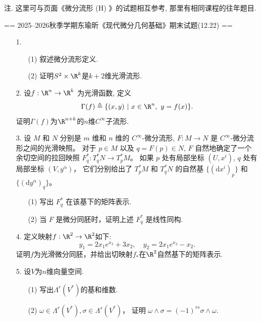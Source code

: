 
注. 这里可与页面《微分流形 (H) 》的试题相互参考, 那里有相同课程的往年题目.

== 2025--2026秋季学期东瑜昕《现代微分几何基础》期末试题(12.22) ==
\begin{itemize}
    \item[1.]
    \begin{enumerate}
        \item[(1)]叙述微分流形定义.
        \item[(2)]证明$S^2\times\R^{k}$是$k+2$维光滑流形.
    \end{enumerate}
    
    \item[2.]设$f: \R^n \rightarrow \R^k$ 为光滑函数, 定义\[\Gamma(f)
    \triangleq\{(x,y)\ |\ x\in\R^n,\ y=f(x)\}.\]证明$\Gamma(f)$为$\R^{n+k}$的$n$维$C^\infty$子流形.

    \item[3.]
    设 $M$ 和 $N$ 分别是 $m$ 维和 $n$ 维的 $C^{\infty}$-微分流形, 
$F: M \rightarrow N$ 是 $C^{\infty}$-微分流形之间的光滑映照。
对于 $p \in M$ 以及 $q=F(p) \in N$, $F$ 自然地确定了一个余切空间的拉回映照 $F_{q}^{*}: T_{q}^{*} N \rightarrow T_{p}^{*} M$。
如果 $p$ 处有局部坐标 $\left(U, x^{i}\right)$, $q$ 处有局部坐标 $\left(V, y^{\alpha}\right)$，
它们分别给出了 $T_{p}^{*} M$ 和 $T_{q}^{*} N$ 的自然基 $\{(\mathrm{d} x^{i})_{p}\}$ 和 $\{(\mathrm{d} y^{\alpha})_{q}\}$。
    \begin{enumerate}
        \item[(1)]写出 $F_{q}^{*}$ 在该基下的矩阵表示.
        \item[(2)]当 $F$ 是微分同胚时，证明上述 $F_{q}^{*}$ 是线性同构.
    \end{enumerate}
    
    \item[4.]定义映射$f:\R^2\to\R^2$如下:
    \[y_1=2x_1e^{x_2}+3x_2,\quad y_2=2x_1e^{x_2}-x_2.\]
    证明$f$为光滑微分同胚，并给出切映射$f_*$在$\R^2$自然基下的矩阵表示.
    
    \item[5.] 
    设$V$为$n$维向量空间.
    \begin{enumerate}
        \item[(1)]写出$\Lambda^r(V^*)$的基和维数.
        \item[(2)]$\omega \in \Lambda^r(V^*),\sigma \in \Lambda^s(V^*)$，
        证明 $\omega \wedge \sigma=(-1)^{rs}\sigma \wedge \omega$.
    \end{enumerate}
    

\end{itemize}
